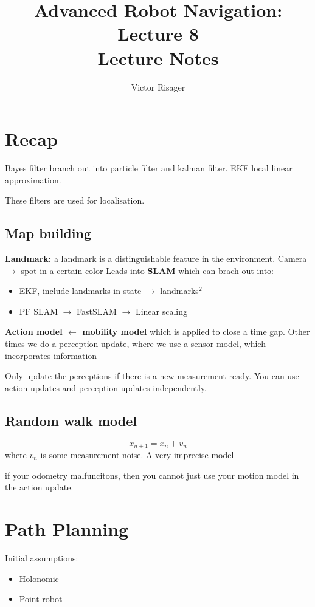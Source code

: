 \documentclass[a4paper]{article}
\title{Advanced Robot Navigation: Lecture 8 \\
	\large Lecture Notes}
\author{Victor Risager}
\begin{document}
\maketitle

\section{Recap}
Bayes filter branch out into particle filter and kalman filter.
EKF local linear approximation.

These filters are used for localisation.

\subsection{Map building}
\textbf{Landmark:} a landmark is a distinguishable feature in the environment. Camera $\rightarrow$  spot in a certain color
Leads into \textbf{SLAM} which can brach out into: 
\begin{itemize}
	\item EKF, include landmarks in state $ \rightarrow  $ landmarks$^2$
	\item PF SLAM $ \rightarrow  $ FastSLAM $ \rightarrow  $ Linear scaling
\end{itemize}

\textbf{Action model $ \leftarrow $ mobility model} which is applied to close a time gap. Other times we do a perception update, where we use a sensor model, which incorporates information 

Only update the perceptions if there is a new measurement ready.
You can use action updates and perception updates independently.

\subsection{Random walk model}
\begin{equation}
	x_{n+1} = x_n + v_n 
\end{equation}
where $ v_n $ is some measurement noise.
A very imprecise model 

if your odometry malfuncitons, then you cannot just use your motion model in the action update. 

\section{Path Planning}
Initial assumptions:
\begin{itemize}
	\item Holonomic
	\item Point robot
\end{itemize}
\end{document}

